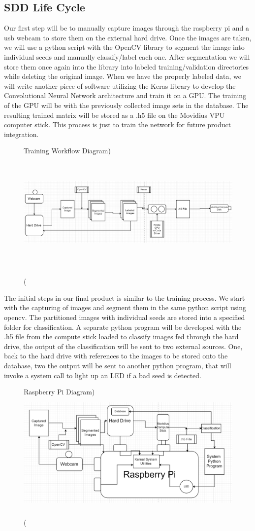 \subsection{SDD Life Cycle}
Our first step will be to manually capture images through the raspberry pi and a usb webcam to store them on the external hard drive. Once the images are taken, we will use a python script with the OpenCV library to segment the image into individual seeds and manually classify/label each one. After segmentation we will store them once again into the library into labeled training/validation directories while deleting the original image. When we have the properly labeled data, we will write another piece of software utilizing the Keras library to develop the Convolutional Neural Network architecture and train it on a GPU. The training of the GPU will be with the previously collected image sets in the database. The resulting trained matrix will be stored as a .h5 file on the Movidius VPU computer stick. This process is just to train the network for future product integration.

\begin{figure}[h]
\caption(Training Workflow Diagram)
\centering
\includegraphics[height=6cm]{Trainingseeddiagram}
\end{figure}

The initial steps in our final product is similar to the training process. We start with the capturing of images and segment them in the same python script using opencv. The partitioned images with individual seeds are stored into a specified folder for classification. A separate python program will be developed with the .h5 file from the compute stick loaded to classify images fed through the hard drive, the output of the classification will be sent to two external sources. One, back to the hard drive with references to the images to be stored onto the database, two the output will be sent to another python program, that will invoke a system call to light up an LED if a bad seed is detected.

\begin{figure}[h]
\caption(Raspberry Pi Diagram)
\centering
\includegraphics[height=6cm]{Raspiseeddiagram}
\end{figure}
